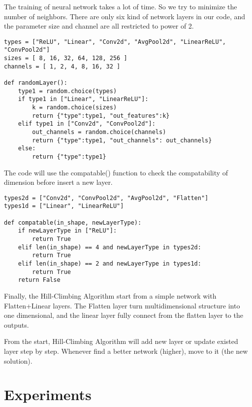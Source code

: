 \documentclass{article}
\begin{document}
The training of neural network takes a lot of time. So we try to minimize the number of neighbors. There are only six kind of network layers in our code, and the parameter size and channel are all restricted to power of 2.

\begin{minipage}{\linewidth}
\begin{lstlisting}
types = ["ReLU", "Linear", "Conv2d", "AvgPool2d", "LinearReLU", "ConvPool2d"]
sizes = [ 8, 16, 32, 64, 128, 256 ]
channels = [ 1, 2, 4, 8, 16, 32 ]

def randomLayer():
    type1 = random.choice(types)
    if type1 in ["Linear", "LinearReLU"]:
        k = random.choice(sizes)
        return {"type":type1, "out_features":k}
    elif type1 in ["Conv2d", "ConvPool2d"]:
        out_channels = random.choice(channels)
        return {"type":type1, "out_channels": out_channels}
    else:                                    
        return {"type":type1}
\end{lstlisting}
\end{minipage}

The code will use the compatable() function to check the compatability of dimension before insert a new layer.

\begin{minipage}{\linewidth}
\begin{lstlisting}
types2d = ["Conv2d", "ConvPool2d", "AvgPool2d", "Flatten"]
types1d = ["Linear", "LinearReLU"]

def compatable(in_shape, newLayerType):
    if newLayerType in ["ReLU"]:
        return True
    elif len(in_shape) == 4 and newLayerType in types2d:
        return True
    elif len(in_shape) == 2 and newLayerType in types1d:
        return True
    return False
\end{lstlisting}
\end{minipage}

Finally, the Hill-Climbing Algorithm start from a simple network with Flatten+Linear layers. The Flatten layer turn multidimensional structure into one dimensional, and the linear layer fully connect from the flatten layer to the outputs. 

From the start, Hill-Climbing Algorithm will add new layer or update existed layer step by step. Whenever find a better network (higher), move to it (the new solution). 

\section{Experiments}
\end{document}
